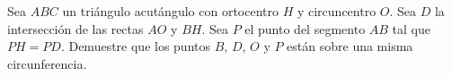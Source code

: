 Sea $ABC$ un triángulo acutángulo con ortocentro $H$ y circuncentro $O$. Sea $D$ la intersección de las rectas $AO$ y $BH$. Sea $P$ el punto del segmento $AB$ tal que $PH = PD$. Demuestre que los puntos $B$, $D$, $O$ y $P$ están sobre una misma circunferencia.
